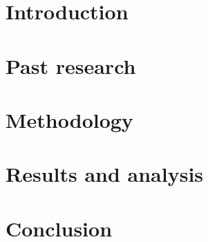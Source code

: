 
\tableofcontents




\glsaddall
{}
\setlength{\glsnamewidth}{0.25\textwidth}
\setlength{\glsdescwidth}{0.75\textwidth}
\renewcommand*{\glsgroupskip}{}

\printglossary[title={Glossary}]



\mainmatter

\chapter{Introduction}
\label{ch:introduction}


\chapter{Past research}
\label{ch:theory}


\chapter{Methodology}
\label{ch:methodology}


\chapter{Results and analysis}
\label{ch:results}


\chapter{Conclusion}
\label{ch:conclusion}


